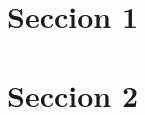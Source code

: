 \hypertarget{index_sec1}{}\section{Seccion 1}\label{index_sec1}
\hypertarget{index_sec2}{}\section{Seccion 2}\label{index_sec2}

